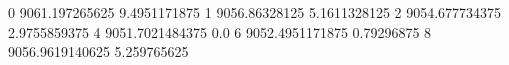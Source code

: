 0 9061.197265625 9.4951171875
1 9056.86328125 5.1611328125
2 9054.677734375 2.9755859375
4 9051.7021484375 0.0
6 9052.4951171875 0.79296875
8 9056.9619140625 5.259765625
